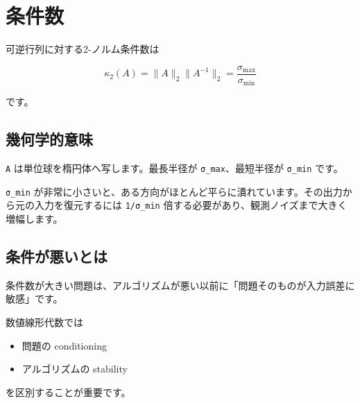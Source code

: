 \documentclass[
  11pt,
  a4paper,
]{ltjsarticle}
\author{}
\date{}
\providecommand{\tightlist}{%
  \setlength{\itemsep}{0pt}\setlength{\parskip}{0pt}}
\begin{document}
\hypertarget{ux6761ux4ef6ux6570}{%
\section{条件数}\label{ux6761ux4ef6ux6570}}

可逆行列に対する2-ノルム条件数は

\[
\boxed{\kappa_2(A)=\|A\|_2\|A^{-1}\|_2=\frac{\sigma_{\max}}{\sigma_{\min}}}
\]

です。

\hypertarget{ux5e7eux4f55ux5b66ux7684ux610fux5473}{%
\subsection{幾何学的意味}\label{ux5e7eux4f55ux5b66ux7684ux610fux5473}}

\texttt{A} は単位球を楕円体へ写します。最長半径が
\texttt{σ\_max}、最短半径が \texttt{σ\_min} です。

\texttt{σ\_min}
が非常に小さいと、ある方向がほとんど平らに潰れています。その出力から元の入力を復元するには
\texttt{1/σ\_min} 倍する必要があり、観測ノイズまで大きく増幅します。

\hypertarget{ux6761ux4ef6ux304cux60aaux3044ux3068ux306f}{%
\subsection{条件が悪いとは}\label{ux6761ux4ef6ux304cux60aaux3044ux3068ux306f}}

条件数が大きい問題は、アルゴリズムが悪い以前に「問題そのものが入力誤差に敏感」です。

数値線形代数では

\begin{itemize}
\tightlist
\item
  問題の conditioning
\item
  アルゴリズムの stability
\end{itemize}

を区別することが重要です。
\end{document}
